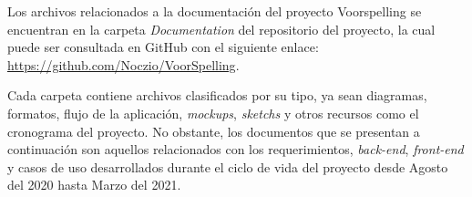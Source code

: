 Los archivos relacionados a la documentación del proyecto Voorspelling se encuentran en la carpeta \textit{Documentation} del repositorio del proyecto, la cual puede ser consultada en GitHub con el siguiente enlace: \url{https://github.com/Noczio/VoorSpelling}.

Cada carpeta contiene archivos clasificados por su tipo, ya sean diagramas, formatos, flujo de la aplicación, \textit{mockups}, \textit{sketchs} y otros recursos como el cronograma del proyecto. No obstante, los documentos que se presentan a continuación son aquellos relacionados con los requerimientos, \textit{back-end}, \textit{front-end} y casos de uso  desarrollados durante el ciclo de vida del proyecto desde Agosto del 2020 hasta Marzo del 2021.

